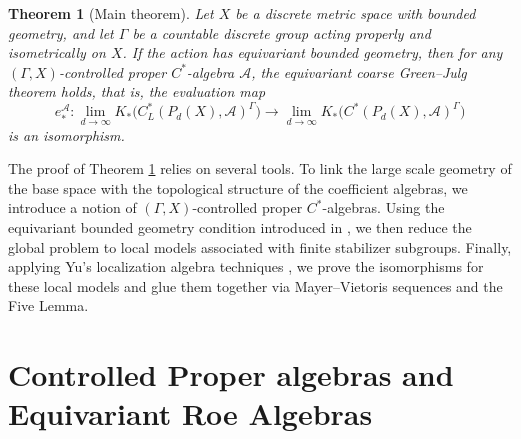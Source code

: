 \documentclass[pdflatex]{sn-jnl}
\theoremstyle{plain}
\newtheorem{theorem}{Theorem}[section]
\theoremstyle{definition}
\begin{document}
\begin{theorem}[Main theorem]\label{main theorem}
Let $X$ be a discrete metric space with bounded geometry, and let $\Gamma$ be a countable discrete group acting properly and isometrically on $X$. If the action has equivariant bounded geometry, then for any $(\Gamma, X)$-controlled proper $C^{*}$-algebra $\mathcal{A}$, the equivariant coarse Green--Julg theorem holds, that is, the evaluation map 
\[e_{*}^{\mathcal{A}}:\lim_{d\to\infty}K_{*}\bigl(C^{*}_{L}(P_{d}(X),\mathcal{A})^\Gamma\bigr)\longrightarrow\lim_{d\to\infty} K_{*}\bigl(C^{*}(P_{d}(X),\mathcal{A})^\Gamma\bigr)\]
is an isomorphism.
\end{theorem}

The proof of Theorem \ref{main theorem} relies on several tools. To link the large scale geometry of the base space with the topological structure of the coefficient algebras, we introduce a notion of $(\Gamma, X)$-controlled proper $C^{*}$-algebras. Using the equivariant bounded geometry condition introduced in \cite{GWWY24}, we then reduce the global problem to local models associated with finite stabilizer subgroups. Finally, applying Yu's localization algebra techniques \cite{Yu97}, we prove the isomorphisms for these local models and glue them together via Mayer--Vietoris sequences and the Five Lemma.

\section{Controlled Proper algebras and Equivariant Roe Algebras}
\end{document}

